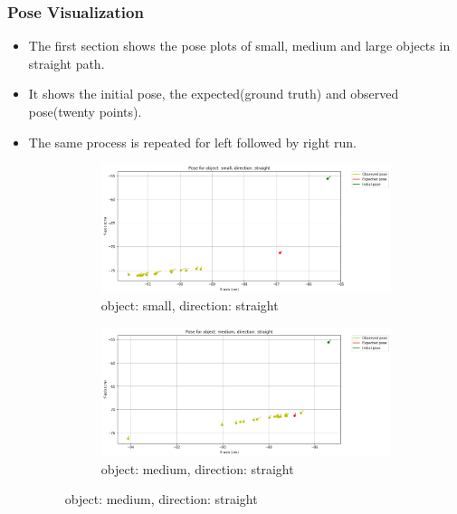\documentclass[10pt,a4paper]{article}
\begin{document}
						 \subsubsection{Pose Visualization}
							\begin{itemize}
								\item The first section shows the pose plots of small, medium and large objects in straight path. 
								\item It shows the initial pose, the expected(ground truth) and observed pose(twenty points).  
								\item The same process is repeated for left followed by right run.
								
								\begin{figure}[H]
									\begin{subfigure}{0.5\textwidth}
										\centering
										\includegraphics[width=0.8\linewidth]{img/pose_small_straight.png}
										\caption{object: small, direction: straight}
										\label{fig:object: small, direction: straight}
									\end{subfigure}%
									\begin{subfigure}{0.5\textwidth}
										\centering
										\includegraphics[width=0.8\linewidth]{img/pose_medium_straight.png}
										\caption{object: medium, direction: straight}
										\label{fig:object: medium, direction: straight}
									\end{subfigure}
									

\end{figure}
\end{itemize}
\end{document}

